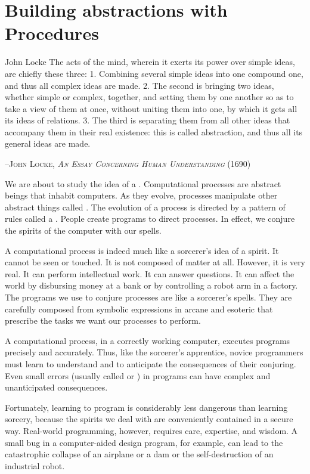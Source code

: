 \mainmatter
\chapter{Building abstractions with Procedures}
\label{chap-1}
\begin{epigraph}{John Locke}
The acts of the mind, wherein it exerts its power over simple ideas,
are chiefly these three: 1. Combining several simple ideas into one
compound one, and thus all complex ideas are made.  2. The second is
bringing two ideas, whether simple or complex, together, and setting
them by one another so as to take a view of them at once, without
uniting them into one, by which it gets all its ideas of relations.
3.  The third is separating them from all other ideas that accompany
them in their real existence: this is called abstraction, and thus all
its general ideas are made.

\textsc{--John Locke, \textit{An Essay Concerning Human Understanding} (1690)}
\end{epigraph}

We are about to study the idea of a .
Computational processes are abstract beings that inhabit computers.
As they evolve, processes manipulate other abstract things called
.  The evolution of a process is directed by a pattern of
rules called a .  People create programs to direct
processes.  In effect, we conjure the spirits of the computer with our
spells.

A computational process is indeed much like a sorcerer's idea of a
spirit.  It cannot be seen or touched.  It is not composed of matter
at all.  However, it is very real.  It can perform intellectual work.
It can answer questions.  It can affect the world by disbursing money
at a bank or by controlling a robot arm in a factory.  The programs we
use to conjure processes are like a sorcerer's spells.  They are
carefully composed from symbolic expressions in arcane and esoteric
 that prescribe the tasks we want our
processes to perform.

A computational process, in a correctly working computer, executes
programs precisely and accurately.  Thus, like the sorcerer's
apprentice, novice programmers must learn to understand and to
anticipate the consequences of their conjuring.  Even small errors
(usually called  or ) in programs can have
complex and unanticipated consequences.

Fortunately, learning to program is considerably less dangerous than
learning sorcery, because the spirits we deal with are conveniently
contained in a secure way.  Real-world programming, however,
requires care, expertise, and wisdom.  A small bug in a computer-aided
design program, for example, can lead to the catastrophic collapse of
an airplane or a dam or the self-destruction of an industrial robot.

